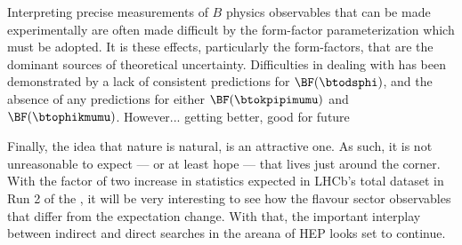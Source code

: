 Interpreting precise measurements of $B$ physics observables that can be made
experimentally are often made difficult by the form-factor parameterization which must be adopted.
It is these \QCD effects, particularly the form-factors, that are the dominant sources of
theoretical uncertainty.
Difficulties in dealing with \QCD has been demonstrated by a lack of consistent predictions for
$\BF(\btodsphi)$, and the absence of any predictions for either $\BF(\btokpipimumu)$ and
$\BF(\btophikmumu)$.
However... getting better, good for future

Finally, the idea that nature is natural, is an attractive one.
As such, it is not unreasonable to expect --- or at least hope --- that \np lives just
around the corner.
With the factor of two increase in statistics expected in LHCb's total dataset in Run 2 of the
\lhc, it will be very interesting to see how the flavour sector observables that differ from the
\sm expectation change.
With that, the important interplay between indirect and direct searches in the areana of \gls{HEP}
looks set to continue.


%








\clearpage
